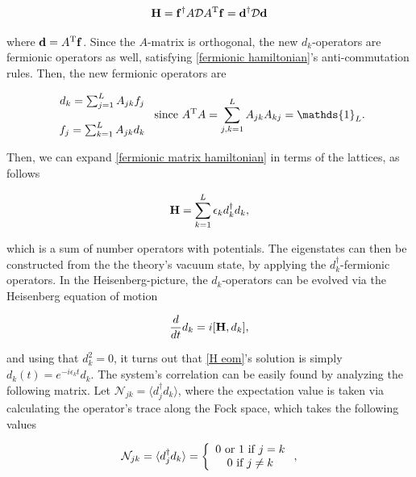 \documentclass{homework}
\begin{document}
\begin{equation}
     {\bf H} = {\bf f}^\dagger A \mathcal{D} A^{\textnormal{T}} {\bf f} = {\bf d}^\dagger \mathcal{D} {\bf d}
     \label{fermionic matrix hamiltonian}
\end{equation}

where ${\bf d} = A^{\textnormal{T}} {\bf f}$. Since the $A$-matrix is orthogonal, the new $d_k$-operators are fermionic operators as well, satisfying \eqref{fermionic hamiltonian}'s anti-commutation rules. Then, the new fermionic operators are 

\begin{equation*}
    \begin{array}{c}
         d_k = \sum_{j=1}^{L} A_{jk} f_j  \\ 
         \\
         f_j = \sum_{k=1}^{L} A_{jk} d_k 
    \end{array} \textnormal{ since } A\transpose A = \sum_{j,k = 1}^{L} A_{jk} A_{kj} = \mathds{1}_{L}.
\end{equation*}

Then, we can expand \eqref{fermionic matrix hamiltonian} in terms of the lattices, as follows 

\begin{equation}
    {\bf H} = \sum_{k = 1}^{L} \epsilon_k d_k^\dagger d_k,
\end{equation}

which is a sum of number operators with potentials. The eigenstates can then be constructed from the the theory's vacuum state, by applying the $d_k^{\dagger}$-fermionic operators. In the Heisenberg-picture, the $d_k$-operators can be evolved via the Heisenberg equation of motion

\begin{equation}
\frac{d}{dt} d_k = i [{\bf H}, d_k],
\label{H eom}
\end{equation}

and using that $d_k^2 = 0$, it turns out that \eqref{H eom}'s solution is simply $d_k(t) = e^{-i\epsilon_k t} d_k$. The system's correlation can be easily found by analyzing the following matrix. Let $\mathcal{N}_{jk} = \langle d_j^\dagger d_k \rangle$, where the expectation value is taken via calculating the operator's trace along the Fock space, which takes the following values 

\begin{equation}
    \mathcal{N}_{jk} = \langle d_j^\dagger d_k \rangle = \left\{\begin{array}{c}
        0 \textnormal{ or } 1 \textnormal{ if } j=k  \\
        0 \textnormal{ if } j \neq k 
    \end{array} \right.,
\end{equation}
\end{document}
